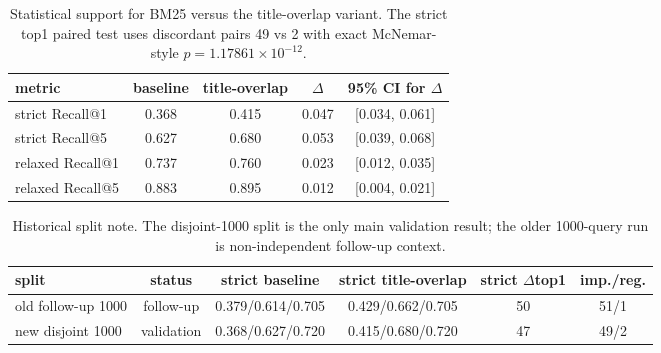 \begin{table}[t]
\centering
\caption{Statistical support for BM25 versus the title-overlap variant. The strict top1 paired test uses discordant pairs 49 vs 2 with exact McNemar-style $p=1.17861\times10^{-12}$.}
\begin{tabular}{lcccc}
\hline
metric & baseline & title-overlap & $\Delta$ & 95\% CI for $\Delta$ \\
\hline
strict Recall@1 & 0.368 & 0.415 & 0.047 & [0.034, 0.061] \\
strict Recall@5 & 0.627 & 0.680 & 0.053 & [0.039, 0.068] \\
relaxed Recall@1 & 0.737 & 0.760 & 0.023 & [0.012, 0.035] \\
relaxed Recall@5 & 0.883 & 0.895 & 0.012 & [0.004, 0.021] \\
\hline
\end{tabular}
\end{table}

\begin{table}[t]
\centering
\caption{Historical split note. The disjoint-1000 split is the only main validation result; the older 1000-query run is non-independent follow-up context.}
\begin{tabular}{lccccc}
\hline
split & status & strict baseline & strict title-overlap & strict $\Delta$top1 & imp./reg. \\
\hline
old follow-up 1000 & follow-up & 0.379/0.614/0.705 & 0.429/0.662/0.705 & 50 & 51/1 \\
new disjoint 1000 & validation & 0.368/0.627/0.720 & 0.415/0.680/0.720 & 47 & 49/2 \\
\hline
\end{tabular}
\end{table}
